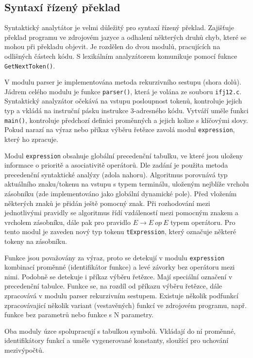 \documentclass[a4paper, 12pt]{article}[5.12.2012]
\begin{document}
\subsection{Syntaxí řízený překlad} \label{ss:syntax}
Syntaktický analytátor je velmi důležitý pro syntaxí řízený překlad. Zajišťuje překlad programu ve 
zdrojovém jazyce a odhalení některých druhů chyb, které se mohou při překladu objevit. Je rozdělen 
do dvou modulů, pracujících na odlišných částech kódu. S lexikálním analyzátorem komunikuje pomocí 
fuknce \texttt{GetNextToken()}.

V modulu parser je implementována metoda rekurzivního sestupu (shora dolů). Jádrem celého modulu je 
funkce \texttt{parser()}, která je volána ze souboru \texttt{ifj12.c}. Syntaktický analyzátor očekává na vstupu 
posloupnost tokenů, kontroluje jejich typ a vkládá na instruční pásku instrukce 3-adresného kódu.
Vytváří uměle funkci \texttt{main()}, kontroluje předchozí definici proměnných a jejich kolize s klíčovými 
slovy. Pokud narazí na výraz nebo příkaz výběru řetězce zavolá modul \texttt{expression}, který ho zpracuje.

Modul \texttt{expression} obsahuje globální precedenční tabulku, ve které jsou uloženy informace o prioritě 
a asociativitě operátorů. Dle zadání je použita metoda precedenční syntaktické analýzy 
(zdola nahoru). Algoritmus porovnává typ aktuálního znaku/tokenu na vstupu s typem terminálu, 
uloženým nejblíže vrcholu zásobníku (zde implementováno jako globální dynamické pole). Před vložením 
některých znaků je přidán ještě pomocný znak. Při rozhodování mezi jednotlivými pravidly se algoritmus 
řídí vzdáleností mezi pomocným znakem a vrcholem zásobníku, dále pak pro pravidlo $E\rightarrow E\ op\ E$ typem 
operátoru. Pro tento modul je zaveden nový typ tokenu \texttt{tExpression}, který označuje některé
tokeny na zásobníku. 

Funkce jsou považovány za výraz, proto se detekují v modulu \texttt{expression} kombinací proměnné 
(identifikátor funkce) a levé závorky bez operátoru mezi nimi. Podobně se detekuje i příkaz výběru řetězce. 
Mají speciální označení v precedenční tabulce. Funkce se, na rozdíl od příkazu výběru řetězce, 
dále zpracovává v modulu parser rekurzivním sestupem. Existuje několik podfunkcí zpracovávajicí několik 
variant (vestavěných) funkcí ve zdrojovém programu, např. funkce bez parametrů nebo funkce s N parametry.

Oba moduly úzce spolupracují s tabulkou symbolů. Vkládají do ní proměnné, identifikátory funkcí a uměle 
vygenerované konstanty, sloužící pro uchování mezivýpočtů. 
\end{document}
